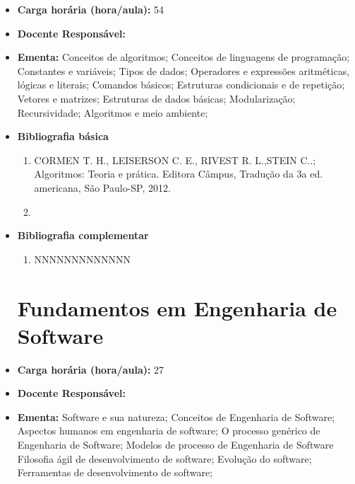\documentclass[11pt,fleqn]{book} %
\begin{document}
\begin{itemize}
	\item \textbf{Carga horária (hora/aula):} 54
	\item \textbf{Docente Responsável:}~
	\item \textbf{Ementa:} 
	Conceitos de algoritmos;
	Conceitos de linguagens de programação;
	Constantes e variáveis;
	Tipos de dados;
	Operadores e expressões aritméticas, lógicas e literais; 
	Comandos básicos;
	Estruturas condicionais e de repetição;
	Vetores e matrizes;
	Estruturas de dados básicas;
	Modularização;
	Recursividade;
	Algoritmos e meio ambiente;
	\item \textbf{Bibliografia básica}
	\begin{enumerate}
		\item CORMEN T. H., LEISERSON C. E., RIVEST R. L.,STEIN C..; Algoritmos: Teoria e prática. Editora Câmpus, Tradução da 3a ed. americana, São Paulo-SP, 2012.
		\item 
	\end{enumerate}
	\item \textbf{Bibliografia complementar}
	\begin{enumerate}
		\item NNNNNNNNNNNNN
	\end{enumerate}


\newpage	
\section{Fundamentos em Engenharia de Software}\label{disc:engenharia_de_software}
	
	\item \textbf{Carga horária (hora/aula):} 27
	\item \textbf{Docente Responsável:}~
	\item \textbf{Ementa:} 
    Software e sua natureza;
	Conceitos de Engenharia de Software;
	Aspectos humanos em engenharia de software;
	O processo genérico de Engenharia de Software;
	Modelos de processo de Engenharia de Software
	Filosofia ágil de desenvolvimento de software;
    Evolução do software;
    Ferramentas de desenvolvimento de software;
	

\end{itemize}
\end{document}
